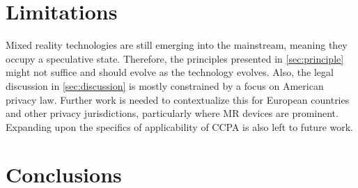 \documentclass[letterpaper,twocolumn,10pt]{article}
\begin{document}
\section{Limitations}
Mixed reality technologies are still emerging into the mainstream, meaning they occupy a speculative state. Therefore, the principles presented in \autoref{sec:principle} might not suffice and should evolve as the technology evolves.
Also, the legal discussion in \autoref{sec:discussion} is mostly constrained by a focus on American privacy law. Further work is needed to contextualize this for European countries and other privacy jurisdictions, particularly where MR devices are prominent. Expanding upon the specifics of applicability of CCPA is also left to future work.

\section{Conclusions}


\balance
{}

\end{document}
